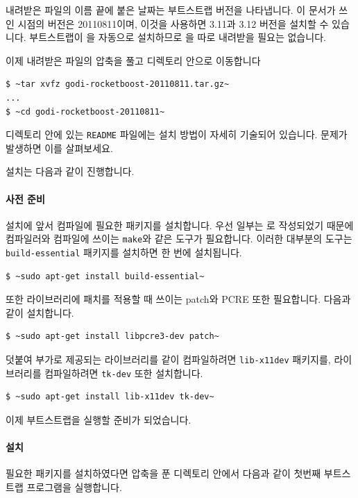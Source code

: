 \begin{center}
\end{center}

내려받은 파일의 이름 끝에 붙은 날짜는 부트스트랩 버전을 나타냅니다. 이 문서가
쓰인 시점의 버전은 20110811이며, 이것을 사용하면 \OCAML{} 3.11과 3.12 버전을
설치할 수 있습니다. 부트스트랩이 \OCAML{}을 자동으로 설치하므로 \OCAML{}을
따로 내려받을 필요는 없습니다.

이제 내려받은 파일의 압축을 풀고 디렉토리 안으로 이동합니다

\begin{lstlisting}
$ ~tar xvfz godi-rocketboost-20110811.tar.gz~
...
$ ~cd godi-rocketboost-20110811~
\end{lstlisting}

디렉토리 안에 있는 \texttt{README} 파일에는 설치 방법이 자세히 기술되어
있습니다. 문제가 발생하면 이를 살펴보세요.

설치는 다음과 같이 진행합니다.

\paragraph{사전 준비} 설치에 앞서 컴파일에 필요한 패키지를
설치합니다. 우선 \OCAML{} 일부는 \CC{}로 작성되었기 때문에 \CC{} 컴파일러와
컴파일에 쓰이는 \texttt{make}와 같은 도구가 필요합니다. 이러한 대부분의 도구는
\texttt{build-essential} 패키지를 설치하면 한 번에 설치됩니다.

\begin{lstlisting}
$ ~sudo apt-get install build-essential~
\end{lstlisting}

또한 라이브러리에 패치를 적용할 때 쓰이는 \textsf{patch}와 \textsf{PCRE} 또한
필요합니다. 다음과 같이 설치합니다.

\begin{lstlisting}
$ ~sudo apt-get install libpcre3-dev patch~
\end{lstlisting}

덧붙여 부가로 제공되는 \GRAPHICS{} 라이브러리를 같이 컴파일하려면
\texttt{lib-x11dev} 패키지를, \LABLTK{} 라이브러리를 컴파일하려면
\texttt{tk-dev} 또한 설치합니다.

\begin{lstlisting}
$ ~sudo apt-get install lib-x11dev tk-dev~
\end{lstlisting}

이제 부트스트랩을 실행할 준비가 되었습니다.

\paragraph{설치} 필요한 패키지를 설치하였다면 압축을 푼 디렉토리
안에서 다음과 같이 첫번째 부트스트랩 프로그램을 실행합니다.

